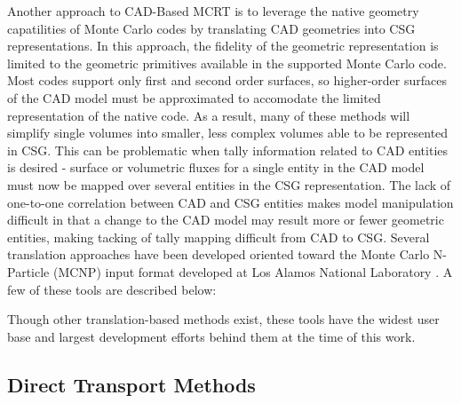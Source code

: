 Another approach to CAD-Based MCRT is to leverage the native geometry
capatilities of Monte Carlo codes by translating CAD geometries into CSG
representations. In this approach, the fidelity of the geometric representation
is limited to the geometric primitives available in the supported Monte Carlo
code. Most codes support only first and second order surfaces, so higher-order
surfaces of the CAD model must be approximated to accomodate the limited
representation of the native code. As a result, many of these methods will
simplify single volumes into smaller, less complex volumes able to be
represented in CSG. This can be problematic when tally information related to
CAD entities is desired - surface or volumetric fluxes for a single entity in
the CAD model must now be mapped over several entities in the CSG
representation. The lack of one-to-one correlation between CAD and CSG entities
makes model manipulation difficult in that a change to the CAD model may result
more or fewer geometric entities, making tacking of tally mapping difficult from
CAD to CSG. Several translation approaches have been developed oriented toward
the Monte Carlo N-Particle (MCNP) input format developed at Los Alamos National
Laboratory \cite{LANL_MCNP5_VOLIII}. A few of these tools are described below:



Though other translation-based methods exist, these tools have the widest
user base and largest development efforts behind them at the time of this work.

\subsection{Direct Transport Methods}

